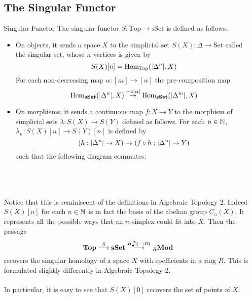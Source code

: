\documentclass[a4paper]{article}
\begin{document}
\subsection{The Singular Functor}
\begin{defn}{Singular Functor}{} The singular functor $S:\text{Top}\to\text{sSet}$ is defined as follows. 
\begin{itemize}
\item On objects, it sends a space $X$ to the simplicial set $S(X):\Delta\to\text{Set}$ called the singular set, whose $n$ vertices is given by $$S(X)[n]=\operatorname{Hom}_{\text{Top}}(\abs{\Delta^n},X)$$ For each non-decreasing map $\alpha:[m]\to[n]$ the pre-composition map $$\operatorname{Hom}_{\bold{sSet}}(\abs{\Delta^n},X)\overset{-\circ\abs{\alpha}}{\rightarrow}\operatorname{Hom}_{\bold{sSet}}(\abs{\Delta^m},X)$$
\item On morphisms, it sends a continuous map $f:X\to Y$ to the morphism of simplicial sets $\lambda:S(X)\to S(Y)$ defined as follows. For each $n\in\mathbb{N}$, $\lambda_n:S(X)[n]\to S(Y)[n]$ is defined by $$\left(h:\abs{\Delta^n}\to X\right)\mapsto\left(f\circ h:\abs{\Delta^n}\to Y\right)$$ such that the following diagram commutes: \\~\\
\\~\\
\end{itemize}
\end{defn}

Notice that this is reminiscent of the definitions in Algebraic Topology 2. Indeed $S(X)[n]$  for each $n\in\mathbb{N}$ is in fact the basis of the abelian group $C_n(X)$. It represents all the possible ways that an $n$-simplex could fit into $X$. Then the passage $$\bold{Top}\overset{S}{\longrightarrow}\bold{sSet}\overset{H_\bullet^\Delta(-;R)}{\longrightarrow}{_R\bold{Mod}}$$ recovers the singular homology of a space $X$ with coefficients in a ring $R$. This is formulated slightly differently in Algebraic Topology 2. \\~\\

In particular, it is easy to see that $S(X)[0]$ recovers the set of points of $X$. 
\end{document}
